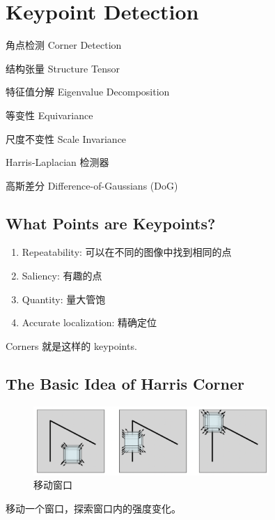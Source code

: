 \chapter{Keypoint Detection}

\begin{introduction}[Keywords]
    \item 角点检测 Corner Detection
    \item 结构张量 Structure Tensor
    \item 特征值分解 Eigenvalue Decomposition
    \item 等变性 Equivariance
    \item 尺度不变性 Scale Invariance
    \item Harris-Laplacian 检测器
    \item 高斯差分 Difference-of-Gaussians (DoG)
\end{introduction}

\section{What Points are Keypoints?}

\begin{enumerate}
    \item Repeatability: 可以在不同的图像中找到相同的点
    \item Saliency: 有趣的点
    \item Quantity: 量大管饱
    \item Accurate localization: 精确定位
\end{enumerate}
Corners 就是这样的 keypoints.

\section{The Basic Idea of Harris Corner}

\begin{figure}[htbp]
    \centering
    \includegraphics[width=0.8\textwidth]{figures/window_moving.png}
    \caption{移动窗口}
\end{figure}

移动一个窗口，探索窗口内的强度变化。

